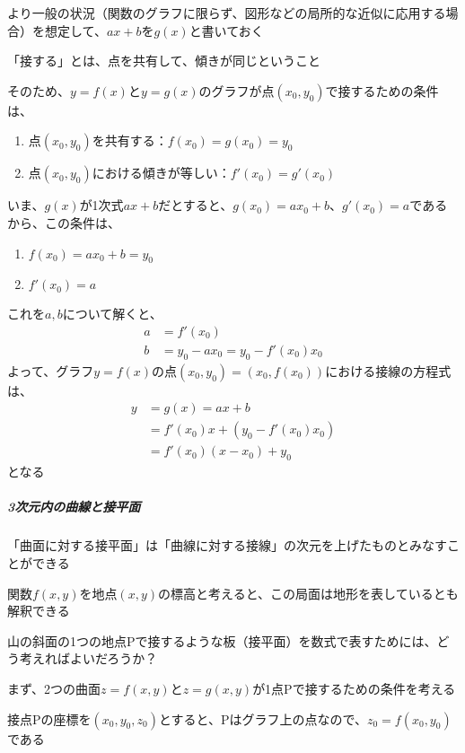 \documentclass[../book_jiriki_calc]{subfiles}
\begin{document}
\br

より一般の状況（関数のグラフに限らず、図形などの局所的な近似に応用する場合）を想定して、$ax+b$を$g(x)$と書いておく

\br

「接する」とは、点を共有して、傾きが同じということ

そのため、$y=f(x)$と$y=g(x)$のグラフが点$(x_0,y_0)$で接するための条件は、
\begin{enumerate}
  \item 点$(x_0,y_0)$を共有する：$f(x_0)=g(x_0) =y_0$
  \item 点$(x_0,y_0)$における傾きが等しい：$f'(x_0)=g'(x_0)$
\end{enumerate}
いま、$g(x)$が1次式$ax+b$だとすると、$g(x_0)=ax_0+b$、$g'(x_0)=a$であるから、この条件は、
\begin{enumerate}
  \item $f(x_0)=ax_0+b=y_0$
  \item $f'(x_0)=a$
\end{enumerate}
これを$a,b$について解くと、
\begin{align*}
  a & = f'(x_0) \\
  b & = y_0 - ax_0 = y_0 - f'(x_0)x_0
\end{align*}
よって、グラフ$y=f(x)$の点$(x_0,y_0) = (x_0,f(x_0))$における接線の方程式は、
\begin{align*}
  y & = g(x) = ax+b \\
    & = f'(x_0)x + \left(y_0 - f'(x_0)x_0\right) \\
    & = f'(x_0)(x-x_0) + y_0
\end{align*}
となる

\sectionline

\subparagraph{3次元内の曲線と接平面}

「曲面に対する接平面」は「曲線に対する接線」の次元を上げたものとみなすことができる

\br

関数$f(x,y)$を地点$(x,y)$の標高と考えると、この局面は地形を表しているとも解釈できる

山の斜面の1つの地点Pで接するような板（接平面）を数式で表すためには、どう考えればよいだろうか？

\sectionline

まず、2つの曲面$z=f(x,y)$と$z=g(x,y)$が1点Pで接するための条件を考える

接点Pの座標を$(x_0,y_0,z_0)$とすると、Pはグラフ上の点なので、$z_0=f(x_0,y_0)$である

\br
\end{document}
